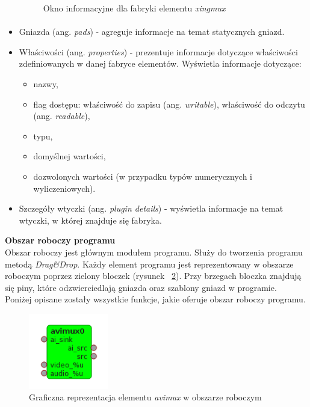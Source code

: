 \documentclass[12pt]{article}
\begin{document}
\begin{itemize}
\begin{figure}[H]
  \caption{Okno informacyjne dla fabryki elementu \textit{xingmux}}
  \label{fig:xingmuxFactoryInfoWindow}
\end{figure}\paragraph{}\vspace{-3mm}
\item Gniazda (ang. \textit{pads}) - agreguje informacje na temat statycznych gniazd.
\item Właściwości (ang. \textit{properties}) - prezentuje informacje dotyczące właściwości zdefiniowanych w danej fabryce elementów. Wyświetla informacje dotyczące:
  \begin{itemize}
    \setlength{\itemsep}{0em}
  \item nazwy,
  \item flag dostępu: właściwość do zapisu (ang. \textit{writable}), właściwość do odczytu (ang. \textit{readable}),
  \item typu,
  \item domyślnej wartości,
  \item dozwolonych wartości (w przypadku typów numerycznych i wyliczeniowych).
  \end{itemize}
\item Szczegóły wtyczki (ang. \textit{plugin details}) - wyświetla informacje na temat wtyczki, w której znajduje się fabryka.
\end{itemize}
\textbf{Obszar roboczy programu} \\
Obszar roboczy jest głównym modułem programu. Służy do tworzenia programu metodą \textit{Drag\&Drop}. Każdy element programu jest reprezentowany w obszarze roboczym poprzez zielony bloczek (rysunek ~\ref{fig:sampleBlock}). Przy brzegach bloczka znajdują się piny, które odzwierciedlają gniazda oraz szablony gniazd w programie. \\
Poniżej opisane zostały wszystkie funkcje, jakie oferuje obszar roboczy programu.
\begin{figure}[H]
  \includegraphics[width=35mm]{img/sample-block.png}
  \caption{Graficzna reprezentacja elementu \textit{avimux} w obszarze roboczym}
  \label{fig:sampleBlock}
\end{figure}
\end{document}
